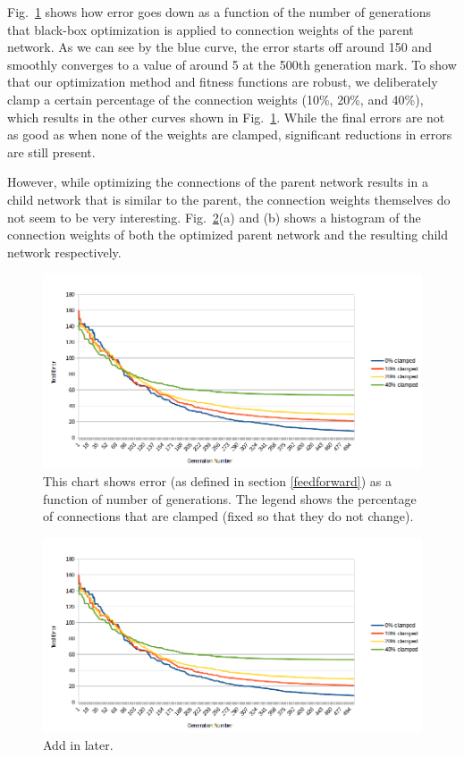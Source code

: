 \documentclass[12pt]{article}
\begin{document}
Fig.~\ref{result1} shows how error goes down
as a function of the number of generations
that black-box optimization is applied
to connection weights of the parent network.
As we can see by the blue curve,
the error starts off around 150 and smoothly converges
to a value of around 5 at the 500th generation mark.
To show that our optimization method
and fitness functions are robust,
we deliberately clamp a certain percentage
of the connection weights (10\%, 20\%, and 40\%),
which results in the other curves
shown in Fig.~\ref{result1}.
While the final errors are not as good
as when none of the weights are clamped,
significant reductions in errors are still present.

However, while optimizing the connections
of the parent network results in a child network
that is similar to the parent,
the connection weights themselves do not seem
to be very interesting.
Fig.~\ref{histogram}(a) and (b) shows a histogram
of the connection weights
of both the optimized parent network
and the resulting child network respectively.

\begin{figure}[h]
\begin{center}
  \includegraphics[width=1.0\linewidth]{result1.png}
\end{center}
   \caption{This chart shows error (as defined in section \ref{feedforward}) as a function of number of generations. The legend shows the percentage of connections that are clamped (fixed so that they do not change).}
\label{result1}
\end{figure}

\begin{figure}[h]
\begin{center}
  \includegraphics[width=1.0\linewidth]{result1.png}
\end{center}
   \caption{Add in later.}
\label{histogram}
\end{figure}
\end{document}
